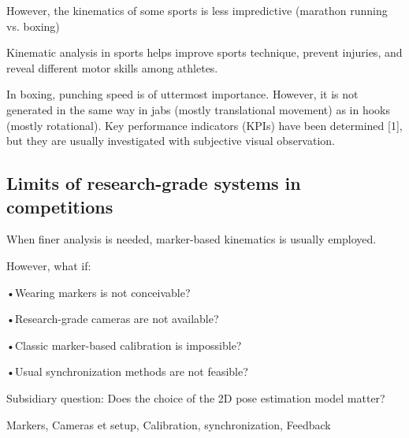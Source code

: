 However, the kinematics of some sports is less impredictive (marathon running vs. boxing)

Kinematic analysis in sports helps improve sports technique, prevent injuries, and reveal different motor skills among athletes. 


In boxing, punching speed is of uttermost importance. However, it is not generated in the same way in jabs (mostly translational movement) as in hooks (mostly rotational). Key performance indicators (KPIs) have been determined [1], but they are usually investigated with subjective visual observation. 






\subsection{Limits of research-grade systems in competitions}

When finer analysis is needed, marker-based kinematics is usually employed. 

However, what if:

•Wearing markers is not conceivable? 

•Research-grade cameras are not available?

•Classic marker-based calibration is impossible? 

•Usual synchronization methods are not feasible? 

Subsidiary question: Does the choice of the 2D pose estimation model matter?



Markers, Cameras et setup, Calibration, synchronization, Feedback






